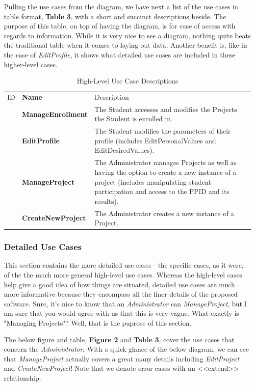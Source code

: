 \documentclass[12pt,letterpaper]{article}
\begin{document}
Pulling the use cases from the diagram, we have next a list of the use cases in table format, {\bf Table 3}, with a short and succinct descriptions beside. The purpose of this table,
on top of having the diagram, is for ease of access with regards to information. While it is very nice to see a diagram, nothing quite beats the traditional table when
it comes to laying out data. Another benefit is, like in the case of {\it EditProfile}, it shows what detailed use cases are included in these higher-level cases.

\begin{table}[H]
	\caption{High-Level Use Case Descriptions}
	\begin{tabu} to 
	    \tableheader{}ID & Name & Description\\
	    \manageenrollment{} & ManageEnrollment & The Student accesses and modifies the Projects the Student is enrolled in.\\
		\editprofile{} & EditProfile & The Student modifies the parameters of their profile (includes EditPersonalValues and EditDesiredValues).\\
		\manageproject{} & ManageProject & The Administrator manages Projects as well as having the option to create a new instance of a project (includes manipulating student participation and access to the PPID and its results).\\
		\createnewproject{} & CreateNewProject & The Administrator creates a new instance of a Project.\\
	\end{tabu}
\end{table}

\subsubsection*{Detailed Use Cases}

This section contains the more detailed use cases - the specific cases, as it were, of the the much more general high-level use cases. Whereas the high-level cases help give a good
idea of how things are situated, detailed use cases are much more informative because they encompass all the finer details of the proposed software. Sure, it's nice to know that
an {\it Administrator} can {\it ManageProject}, but I am sure that you would agree with us that this is very vague. What exactly is "Managing Projects"? Well, that is the puprose of this 
section. 

The below figure and table, {\bf Figure 2} and {\bf Table 3}, cover the use cases that concern the {\it Administrator}. With a quick glance of the below diagram, we can see that {\it ManageProject} actually covers a 
great many details including {\it EditProject} and {\it CreateNewProject}! Note that we denote error cases with an <<extend>> relationship.
\end{document}
